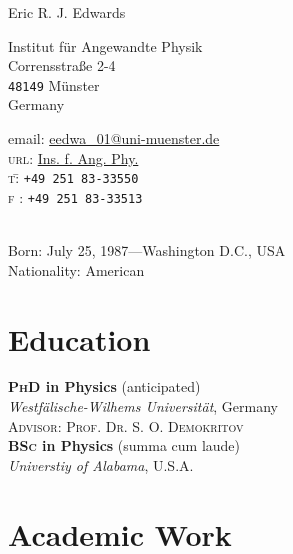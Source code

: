 \documentclass[svgnames, 10pt, a4paper]{article}
\newcommand{\years}[1]{\marginnote{\scriptsize #1}}
\newenvironment{nstabbing}
  {\setlength{\topsep}{0pt}%
   \setlength{\partopsep}{0pt}%
   \tabbing}
  {\endtabbing}
\begin{document}
{\LARGE Eric R. J. Edwards}\\[1cm]
\begin{minipage}{0.5\textwidth}
\begin{flushleft} Institut für Angewandte Physik\\
Corrensstraße 2-4\\
\texttt{48149} Münster\\
Germany\\
\end{flushleft}
\end{minipage}
\begin{minipage}{0.5\textwidth}
\begin{flushleft}
email: \href{mailto:eedwa_01@uni-muenster.de}{eedwa\_{}01@uni-muenster.de}\\
\textsc{url}: \href{http://www.uni-muenster.de/Physik.AP/Demokritov/Organisation/Mitglieder/edwards.shtml}{Ins. f. Ang. Phy.}\\ 
\begin{nstabbing}
\textsc{t}\= : \texttt{+49 251 83-33550}\\
\textsc{f}\> : \texttt{+49 251 83-33513}
\end{nstabbing}
\end{flushleft}
\end{minipage}\\[.2cm]
Born:  July 25, 1987---Washington D.C., USA\\
Nationality:  American

\section*{Education}
\noindent
\years{2012}\textbf{\textsc{PhD} in Physics} {\footnotesize (anticipated)}\\
\emph{Westfälische-Wilhems Universität}, Germany\\
\textsc{Advisor: Prof. Dr. S. O. Demokritov}\\
\years{2009}\textbf{\textsc{BSc} in Physics}  {\footnotesize (summa cum laude)}\\
\emph{Universtiy of Alabama}, U.S.A.

\section*{Academic Work}
\end{document}
